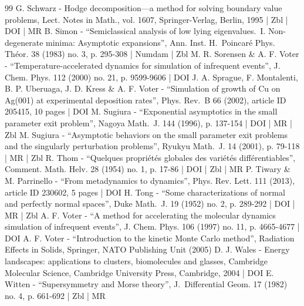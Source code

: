 \begin{thebibliography}{99}
G. Schwarz - Hodge decomposition—a method for solving boundary value problems, Lect. Notes in Math., vol. 1607, Springer-Verlag, Berlin, 1995 | Zbl | DOI | MR
B. Simon - “Semiclassical analysis of low lying eigenvalues. I. Non-degenerate minima: Asymptotic expansions”, Ann. Inst. H. Poincaré Phys. Théor. 38 (1983) no. 3, p. 295-308 | Numdam | Zbl
M. R. Sorensen \& A. F. Voter - “Temperature-accelerated dynamics for simulation of infrequent events”, J. Chem. Phys. 112 (2000) no. 21, p. 9599-9606 | DOI
J. A. Sprague, F. Montalenti, B. P. Uberuaga, J. D. Kress \& A. F. Voter - “Simulation of growth of Cu on Ag(001) at experimental deposition rates”, Phys. Rev. B 66 (2002), article ID 205415, 10 pages | DOI
M. Sugiura - “Exponential asymptotics in the small parameter exit problem”, Nagoya Math. J. 144 (1996), p. 137-154 | DOI | MR | Zbl
M. Sugiura - “Asymptotic behaviors on the small parameter exit problems and the singularly perturbation problems”, Ryukyu Math. J. 14 (2001), p. 79-118 | MR | Zbl
R. Thom - “Quelques propriétés globales des variétés différentiables”, Comment. Math. Helv. 28 (1954) no. 1, p. 17-86 | DOI | Zbl | MR
P. Tiwary \& M. Parrinello - “From metadynamics to dynamics”, Phys. Rev. Lett. 111 (2013), article ID 230602, 5 pages | DOI
H. Tong - “Some characterizations of normal and perfectly normal spaces”, Duke Math. J. 19 (1952) no. 2, p. 289-292 | DOI | MR | Zbl
A. F. Voter - “A method for accelerating the molecular dynamics simulation of infrequent events”, J. Chem. Phys. 106 (1997) no. 11, p. 4665-4677 | DOI
A. F. Voter - “Introduction to the kinetic Monte Carlo method”, Radiation Effects in Solids, Springer, NATO Publishing Unit (2005)
D. J. Wales - Energy landscapes: applications to clusters, biomolecules and glasses, Cambridge Molecular Science, Cambridge University Press, Cambridge, 2004 | DOI
E. Witten - “Supersymmetry and Morse theory”, J. Differential Geom. 17 (1982) no. 4, p. 661-692 | Zbl | MR
\end{thebibliography}
